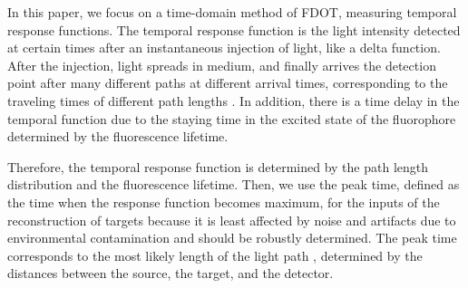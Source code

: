 \documentclass[10pt]{article}
\numberwithin{equation}{section}
\numberwithin{figure}{section}
\begin{document}
In this paper, we focus on a time-domain method of FDOT, measuring temporal response functions.
The temporal response function is the light intensity detected at certain times after an instantaneous injection of light, like a delta function. After the injection, light spreads in medium, and finally arrives the detection point after many different paths at different arrival times, corresponding to the traveling times of different path lengths \cite{Hebden1991}. In addition, there is a time delay in the temporal function due to the staying time in the excited state of the fluorophore determined by the fluorescence lifetime. 
\begin{comment}
Namely, the measured temporal response function is a discretized temporal response function, which is given by the solution of the light propagation model and reflects the optical path length distribution function associated with the target location. 
\end{comment}
Therefore, the temporal response function is determined by the path length distribution and the fluorescence lifetime.
Then, we use the peak time, defined as the time when the response function becomes maximum, for the inputs of the reconstruction of targets because it is least affected by noise and artifacts due to environmental contamination and should be robustly determined. The peak time corresponds to the most likely length of the light path , determined by the distances between the source, the target, and the detector.
\end{document}
